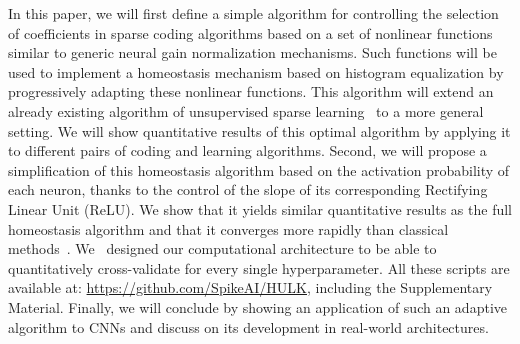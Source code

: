 \documentclass[vision,article,accept,oneauthor,pdftex]{Definitions/mdpi}
\begin{document}
In this paper, we will first define a simple algorithm for controlling the selection of coefficients in sparse coding algorithms based on a set of nonlinear functions similar to generic neural gain normalization mechanisms. Such functions will be used to implement a homeostasis mechanism based on histogram equalization by progressively adapting these nonlinear functions. This algorithm will extend an already existing algorithm of unsupervised sparse learning~\citep{Perrinet10shl} to a more general setting. We will show quantitative results of this optimal algorithm by applying it to different pairs of coding and learning algorithms. Second, we will propose a simplification of this homeostasis algorithm based on the activation probability of each neuron, thanks to the control of the slope of its corresponding Rectifying Linear Unit (ReLU). We show that it yields similar quantitative results as the full homeostasis algorithm and that it converges more rapidly than classical methods~\citep{Olshausen97, Sandin17}. We~ designed our computational architecture to be able to quantitatively cross-validate for every single hyperparameter. All these scripts are available at: \url{https://github.com/SpikeAI/HULK}, including the {Supplementary Material}. %
Finally, we will conclude by showing an application of such an adaptive algorithm to CNNs and discuss on its development in real-world architectures.
%
%
\end{document}
